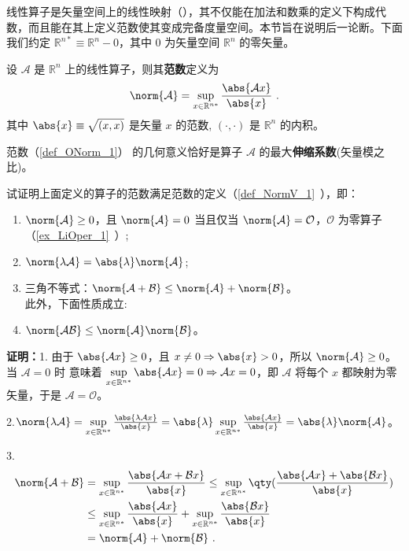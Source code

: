 线性算子是矢量空间上的线性映射（），其不仅能在加法和数乘的定义下构成代数，而且能在其上定义范数使其变成完备度量空间。本节旨在说明后一论断。下面我们约定 $\mathbb R^{n*}\equiv\mathbb R^n-0$，其中 $0$ 为矢量空间 $\mathbb R^n$ 的零矢量。
\begin{definition}{}\label{def_ONorm_1}
设 $\mathcal A$ 是 $\mathbb R^n$ 上的线性算子，则其\textbf{范数}定义为
\begin{equation}\label{eq_ONorm_1}
\norm{\mathcal A}=\sup_{x\in{\mathbb R^{n*}}}\frac{\abs{\mathcal Ax}}{\abs{x}}~.
\end{equation}
其中 $\abs{x}\equiv\sqrt{(x,x)}$ 是矢量 $x$ 的范数, $(\cdot,\cdot)$ 是 $\mathbb R^n$ 的内积。
\end{definition}
范数（\autoref{def_ONorm_1}） 的几何意义恰好是算子 $\mathcal A$ 的最大\textbf{伸缩系数}(矢量模之比)。
\begin{example}{}
试证明上面定义的算子的范数满足范数的定义（\autoref{def_NormV_1}~），即：
\begin{enumerate}
\item $\norm{\mathcal A}\geq0$，且 $\norm{\mathcal A}=0$ 当且仅当 $\norm{\mathcal A}=\mathcal O$，$\mathcal O$ 为零算子（\autoref{ex_LiOper_1}~）;
\item $\norm{\lambda \mathcal A}=\abs{\lambda}\norm{\mathcal A}$;
\item 三角不等式：$\norm{\mathcal A+\mathcal B}\leq\norm{\mathcal A}+\norm{\mathcal B}$。\\
此外，下面性质成立:\\
\item $\norm{\mathcal{AB}}\leq{\norm{\mathcal A}}\norm{\mathcal B}$。
\end{enumerate}
\end{example}
\textbf{证明：}1. 由于 $\abs{\mathcal A x}\geq0$，且 $x\neq0\Rightarrow\abs{x}>0$，所以
$\norm{\mathcal A}\geq0$。当 $\mathcal A=0$ 时 意味着 $\sup\limits_{x\in{\mathbb R^{n*}}}\abs{\mathcal A x}=0\Rightarrow\mathcal A x=0$，即 $\mathcal A$ 将每个 $x$ 都映射为零矢量，于是 $\mathcal A=\mathcal O$。

2.$\norm{\lambda\mathcal A}=\sup\limits_{x\in{\mathbb R^{n*}}}\frac{\abs{\lambda \mathcal Ax}}{\abs{x}}=\abs{\lambda}\sup\limits_{x\in{\mathbb R^{n*}}}\frac{\abs{\mathcal Ax}}{\abs{x}}=\abs{\lambda}\norm{\mathcal A}
$。

3.\begin{equation}
\begin{aligned}
\norm{\mathcal A+\mathcal B}&=\sup\limits_{x\in{\mathbb R^{n*}}}\frac{\abs{\mathcal Ax+\mathcal B x}}{\abs{x}}\leq\sup\limits_{x\in{\mathbb R^{n*}}}\qty(\frac{\abs{\mathcal Ax}+\abs{\mathcal B x}}{\abs{x}})\\
&\leq \sup\limits_{x\in{\mathbb R^{n*}}}\frac{\abs{ \mathcal Ax}}{\abs{x}}+\sup\limits_{x\in{\mathbb R^{n*}}}\frac{\abs{\mathcal B x}}{\abs{x}}\\
&=\norm{\mathcal A}+\norm{\mathcal B}~.
\end{aligned}
\end{equation}

